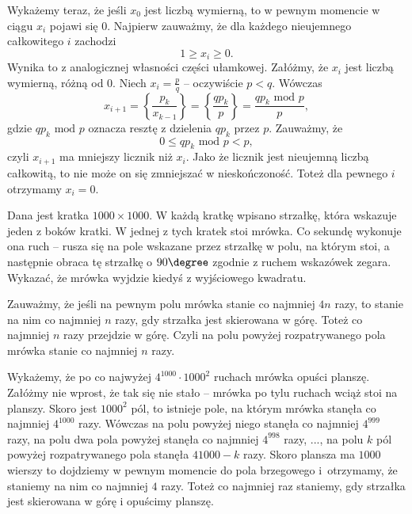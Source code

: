 \vspace{10px}
\noindent
Wykażemy teraz, że jeśli $x_0$ jest liczbą wymierną, to w pewnym momencie w ciągu $x_i$ pojawi się $0$. Najpierw zauważmy, że dla każdego nieujemnego całkowitego $i$ zachodzi 
\[
	1 \geqslant x_i \geqslant 0.
\] 
Wynika to z analogicznej własności części ułamkowej. Załóżmy, że $x_i$ jest liczbą wymierną, różną od 0. Niech $x_i = \frac{p}{q}$ -- oczywiście $p < q$. Wówczas
\[
	x_{i + 1} = \left\{ \dfrac{p_k}{x_{k-1}} \right\} = \left\{ \dfrac{qp_k}{p} \right\} = \frac{qp_k \text{ mod } p}{p},
\]
gdzie $qp_k \text{ mod } p$ oznacza resztę z dzielenia $qp_k$ przez $p$. Zauważmy, że
\[
	0 \leqslant qp_k \text{ mod } p < p,
\]
czyli $x_{i + 1}$ ma mniejszy licznik niż $x_i$. Jako że licznik jest nieujemną liczbą całkowitą, to nie może on się zmniejszać w nieskończoność. Toteż dla pewnego $i$ otrzymamy $x_i = 0$.

\begin{problem}{4}
	Dana jest kratka $1000\times 1000$. W każdą kratkę wpisano strzałkę, która wskazuje jeden z boków kratki. W jednej z tych kratek stoi mrówka. Co sekundę wykonuje ona ruch -- rusza się na pole wskazane przez strzałkę w polu, na którym stoi, a następnie obraca tę strzałkę o $90\degree$ zgodnie z ruchem wskazówek zegara. Wykazać, że mrówka wyjdzie kiedyś z wyjściowego kwadratu.
\end{problem}

\noindent
Zauważmy, że jeśli na pewnym polu mrówka stanie co najmniej $4n$ razy, to stanie na nim co najmniej $n$ razy, gdy strzałka jest skierowana w górę. Toteż co najmniej $n$ razy przejdzie w górę. Czyli na polu powyżej rozpatrywanego pola mrówka stanie co najmniej $n$ razy.

\vspace{10px}
\noindent
Wykażemy, że po co najwyżej $4^{1000} \cdot 1000^2$ ruchach mrówka opuści planszę. Załóżmy nie wprost, że tak się nie stało -- mrówka po tylu ruchach wciąż stoi na planszy. Skoro jest $1000^2$ pól, to istnieje pole, na którym mrówka stanęła co najmniej $4^{1000}$ razy. Wówczas na polu powyżej niego stanęła co najmniej $4^{999}$ razy, na polu dwa pola powyżej stanęła co najmniej $4^{998}$ razy, ..., na polu $k$ pól powyżej rozpatrywanego pola stanęła $4{1000 - k}$ razy. Skoro plansza ma $1000$ wierszy to dojdziemy w pewnym momencie do pola brzegowego i~otrzymamy, że staniemy na nim co najmniej $4$ razy. Toteż co najmniej raz staniemy, gdy strzałka jest skierowana w górę i opuścimy planszę.
\vspace{5px}

